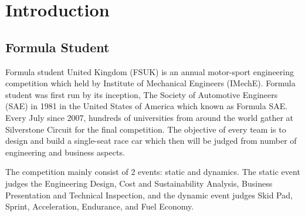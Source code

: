 \newpage
\setcounter{page}{1}
\justifying
\noindent

\section{Introduction}
\subsection{Formula Student}
Formula student United Kingdom (FSUK) is an annual motor-sport engineering competition which held by Institute of Mechanical Engineers (IMechE). Formula student was first run by its inception, The Society of Automotive Engineers (SAE) in 1981 in the United States of America which known as Formula SAE. Every July since 2007, hundreds of universities from around the world gather at Silverstone Circuit for the final competition. The objective of every team is to design and build a single-seat race car which then will be judged from number of engineering and business aspects.

\noindent The competition mainly consist of 2 events: static and dynamics. The static event judges the Engineering  Design,  Cost  and  Sustainability  Analysis, Business Presentation and Technical Inspection, and the dynamic event judges Skid Pad, Sprint, Acceleration, Endurance, and Fuel Economy.


